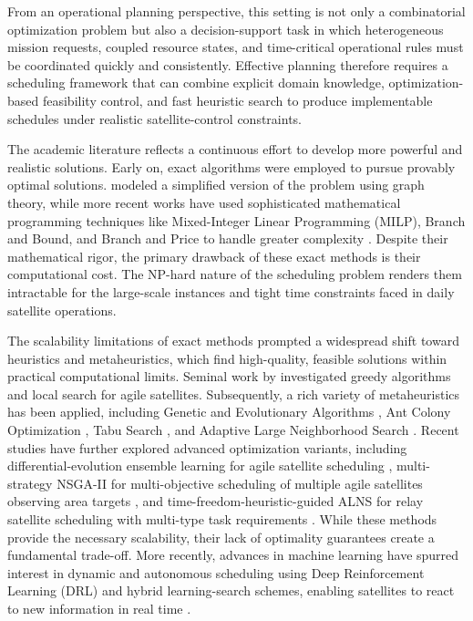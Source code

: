\documentclass[preprint,3p,12pt,authoryear]{elsarticle}
\begin{document}
From an operational planning perspective, this setting is not only a combinatorial optimization problem but also a decision-support task in which heterogeneous mission requests, coupled resource states, and time-critical operational rules must be coordinated quickly and consistently. Effective planning therefore requires a scheduling framework that can combine explicit domain knowledge, optimization-based feasibility control, and fast heuristic search to produce implementable schedules under realistic satellite-control constraints.

The academic literature reflects a continuous effort to develop more powerful and realistic solutions. Early on, exact algorithms were employed to pursue provably optimal solutions. \citet{Gabrel2003} modeled a simplified version of the problem using graph theory, while more recent works have used sophisticated mathematical programming techniques like Mixed-Integer Linear Programming (MILP), Branch and Bound, and Branch and Price to handle greater complexity \citep{Chu2017,Chen2019,Hu2019,Peng2020,peng2025branch}. Despite their mathematical rigor, the primary drawback of these exact methods is their computational cost. The NP-hard nature of the scheduling problem renders them intractable for the large-scale instances and tight time constraints faced in daily satellite operations.

The scalability limitations of exact methods prompted a widespread shift toward heuristics and metaheuristics, which find high-quality, feasible solutions within practical computational limits. Seminal work by \citet{Lemaitre2002} investigated greedy algorithms and local search for agile satellites. Subsequently, a rich variety of metaheuristics has been applied, including Genetic and Evolutionary Algorithms \citep{Tangpattanakul2012,Tangpattanakul2013,Tangpattanakul2015,Zhang2021, wu2022data}, Ant Colony Optimization \citep{Wang2009, zhou2023multi}, Tabu Search \citep{Lin2005, sarkheyli2013using}, and Adaptive Large Neighborhood Search \citep{he2018improved, wu2024improved}. Recent studies have further explored advanced optimization variants, including differential-evolution ensemble learning for agile satellite scheduling \citep{chen2025deem}, multi-strategy NSGA-II for multi-objective scheduling of multiple agile satellites observing area targets \citep{mu2026multi}, and time-freedom-heuristic-guided ALNS for relay satellite scheduling with multi-type task requirements \citep{gu2026ensemble}. While these methods provide the necessary scalability, their lack of optimality guarantees create a fundamental trade-off. More recently, advances in machine learning have spurred interest in dynamic and autonomous scheduling using Deep Reinforcement Learning (DRL) and hybrid learning-search schemes, enabling satellites to react to new information in real time \citep{wei2021deep, herrmann2023reinforcement, qi2025deep, ahmadi2025enhancing}.
\end{document}
